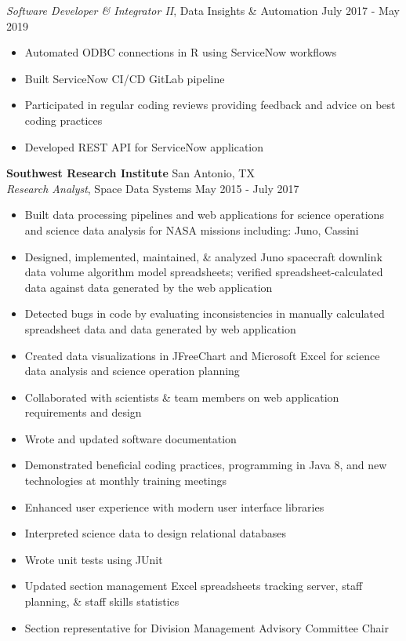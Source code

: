 \documentclass[a4paper]{article}
\begin{document}
\textit{Software Developer \& Integrator II}, Data Insights \& Automation \hfill July 2017 - May 2019\\
\vspace{-1mm}
\begin{itemize} \itemsep .5pt
	\item Automated ODBC connections in R using ServiceNow workflows
	\item Built ServiceNow CI/CD GitLab pipeline
	\item Participated in regular coding reviews providing feedback and advice on best coding practices
	\item Developed REST API for ServiceNow application 
\end{itemize}
\textbf{Southwest Research Institute} \hfill San Antonio, TX\\
\textit{Research Analyst}, Space Data Systems \hfill May 2015 - July 2017\\
\vspace{-1mm}
\begin{itemize} \itemsep .5pt
	\item Built data processing pipelines and web applications for science operations and science data analysis for NASA missions including: Juno, Cassini
	\item Designed, implemented, maintained, \& analyzed Juno spacecraft downlink data volume algorithm model spreadsheets; verified spreadsheet-calculated data against data generated by the web application
	\item Detected bugs in code by evaluating inconsistencies in manually calculated spreadsheet data and data generated by web application
	\item Created data visualizations in JFreeChart and Microsoft Excel for science data analysis and science operation planning
	\item Collaborated with scientists \& team members on web application requirements and design
	\item Wrote and updated software documentation
	\item Demonstrated beneficial coding practices, programming in Java 8, and new technologies at monthly training meetings
	\item Enhanced user experience with modern user interface libraries
	\item Interpreted science data to design relational databases
	\item Wrote unit tests using JUnit
	\item Updated section management Excel spreadsheets tracking server, staff planning, \& staff skills statistics
	\item Section representative for Division Management Advisory Committee Chair 
\end{itemize}
\end{document}
